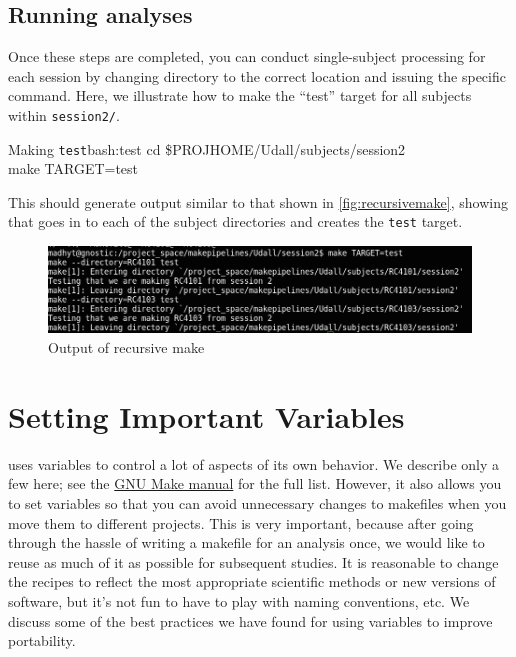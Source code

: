\subsection{Running analyses}
Once these steps are completed, you can conduct single-subject processing for each session by changing directory to the correct location and issuing the specific \maken{} command. Here, we illustrate how to make the ``test'' target for all subjects within \texttt{session2/}.

\begin{bash}{Making \texttt{test}}{bash:test}
	cd \$PROJHOME/Udall/subjects/session2 \\
	make TARGET=test
\end{bash}

This should generate output similar to that shown in \autoref{fig:recursivemake}, showing that \maken{} goes in to each of the subject directories and creates the \texttt{test} target.

\begin{figure}[h]

\includegraphics[scale=0.5]{make-output.png}
\caption{Output of recursive make}
\label{fig:recursivemake}
\end{figure}

\section{Setting Important Variables}

\maken{} uses variables to control a lot of aspects of its own behavior. We describe only a few here; see the \href{http://www.gnu.org/software/make/manual/}{GNU Make manual} for the full list. However, it also allows you to set variables so that you can avoid unnecessary changes to makefiles when you move them to different projects. This is very important, because after going through the hassle of writing a makefile for an analysis once, we would like to reuse as much of it as possible for subsequent studies. It is reasonable to change the recipes to reflect the most appropriate scientific methods or new versions of software, but it's not fun to have to play with naming conventions, etc. We discuss some of the best practices we have found for using variables to improve portability.

